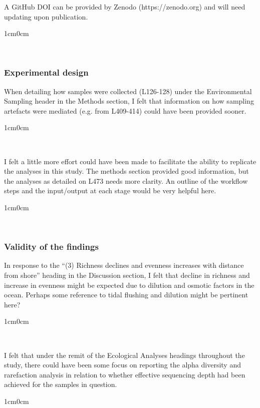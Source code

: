 \documentclass{article}
\newenvironment{response}
	{
	\begin{adjustwidth}{1cm}{0cm}
	\itshape %
	}
	{
	\end{adjustwidth}
	}
\begin{document}
A GitHub DOI can be provided by Zenodo (https://zenodo.org) and will need updating upon publication.
\begin{response}
  \\
\end{response}

\subsubsection*{Experimental design}
When detailing how samples were collected (L126-128) under the Environmental Sampling header in the Methods section, I felt that information on how sampling artefacts were mediated (e.g. from L409-414) could have been provided sooner.
\begin{response}
  \\
\end{response}

I felt a little more effort could have been made to facilitate the ability to replicate the analyses in this study. The methods section provided good information, but the analyses as detailed on L473 needs more clarity. An outline of the workflow steps and the input/output at each stage would be very helpful here.
\begin{response}
  \\
\end{response}

\subsubsection*{Validity of the findings}
In response to the “(3) Richness declines and evenness increases with distance from shore” heading in the Discussion section, I felt that decline in richness and increase in evenness might be expected due to dilution and osmotic factors in the ocean. Perhaps some reference to tidal flushing and dilution might be pertinent here?
\begin{response}
  \\
\end{response}

I felt that under the remit of the Ecological Analyses headings throughout the study, there could have been some focus on reporting the alpha diversity and rarefaction analysis in relation to whether effective sequencing depth had been achieved for the samples in question.
\begin{response}
  \\
\end{response}
\end{document}

